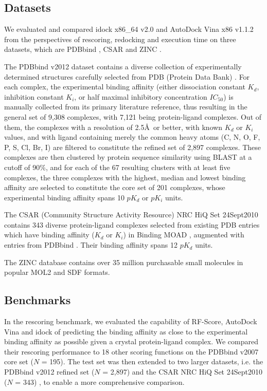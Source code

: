 \subsection{Datasets}

We evaluated and compared idock x86\_64 v2.0 and AutoDock Vina x86 v1.1.2 from the perspectives of rescoring, redocking and execution time on three datasets, which are PDBbind \citep{529,530}, CSAR \citep{857,960} and ZINC \citep{532,1178}.

The PDBbind v2012 dataset contains a diverse collection of experimentally determined structures carefully selected from PDB (Protein Data Bank) \citep{540,537}. For each complex, the experimental binding affinity (either dissociation constant $K_d$, inhibition constant $K_i$, or half maximal inhibitory concentration $IC_{50}$) is manually collected from its primary literature reference, thus resulting in the general set of 9,308 complexes, with 7,121 being protein-ligand complexes. Out of them, the complexes with a resolution of 2.5\AA\ or better, with known $K_d$ or $K_i$ values, and with ligand containing merely the common heavy atoms (C, N, O, F, P, S, Cl, Br, I) are filtered to constitute the refined set of 2,897 complexes. These complexes are then clustered by protein sequence similarity using BLAST at a cutoff of 90\%, and for each of the 67 resulting clusters with at least five complexes, the three complexes with the highest, median and lowest binding affinity are selected to constitute the core set of 201 complexes, whose experimental binding affinity spans 10 $pK_d$ or $pK_i$ units.

The CSAR (Community Structure Activity Resource) NRC HiQ Set 24Sept2010 contains 343 diverse protein-ligand complexes selected from existing PDB \citep{540,537} entries which have binding affinity ($K_d$ or $K_i$) in Binding MOAD \citep{517,518}, augmented with entries from PDBbind \citep{529,530}. Their binding affinity spans 12 $pK_d$ units.

The ZINC database contains over 35 million purchasable small molecules in popular MOL2 and SDF formats.

\subsection{Benchmarks}

In the rescoring benchmark, we evaluated the capability of RF-Score, AutoDock Vina and idock of predicting the binding affinity as close to the experimental binding affinity as possible given a crystal protein-ligand complex. We compared their rescoring performance to 18 other scoring functions on the PDBbind v2007 core set ($N$ = 195). The test set was then extended to two larger datasets, i.e. the PDBbind v2012 refined set ($N$ = 2,897) \citep{529,530} and the CSAR NRC HiQ Set 24Sept2010 ($N$ = 343) \citep{857,960}, to enable a more comprehensive comparison.

